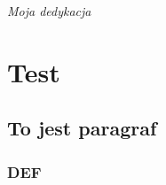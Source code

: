 \documentclass[polski]{amuthesis}
\author{Bartłomiej Przybylski}
\date{Poznań, wrzesień 2017}
\begin{document}
\maketitle

\makestatement

\begin{streszczenie}
\lipsum[1]
\end{streszczenie}

\begin{abstract}
\lipsum[1]
\end{abstract}

\begin{podziekowania}
\lipsum[5]
\end{podziekowania}

\begin{dedykacja}
\emph{Moja dedykacja}
\end{dedykacja}

\tableofcontents

\chapter{Test}

\lipsum[1]

\section{To jest paragraf}

\lipsum[2-3]

\subsection{DEF}

\lipsum[4]
\end{document}
